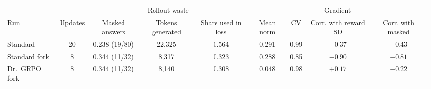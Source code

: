 \begin{adjustbox}{max width=\linewidth}
\begin{tabular}{lcccccccc}
\toprule
 & & \multicolumn{3}{c}{Rollout waste} & \multicolumn{4}{c}{Gradient} \\
\cmidrule(lr){3-5} \cmidrule(lr){6-9}
Run & Updates & Masked answers & Tokens generated & Share used in loss & Mean norm & CV & Corr. with reward SD & Corr. with masked \\
\midrule
Standard & 20 & 0.238 (19/80) & 22,325 & 0.564 & 0.291 & 0.99 & $-0.37$ & $-0.43$ \\
Standard fork & 8 & 0.344 (11/32) & 8,317 & 0.323 & 0.288 & 0.85 & $-0.90$ & $-0.81$ \\
Dr.~GRPO fork & 8 & 0.344 (11/32) & 8,140 & 0.308 & 0.048 & 0.98 & $+0.17$ & $-0.22$ \\
\bottomrule
\end{tabular}
\end{adjustbox}
